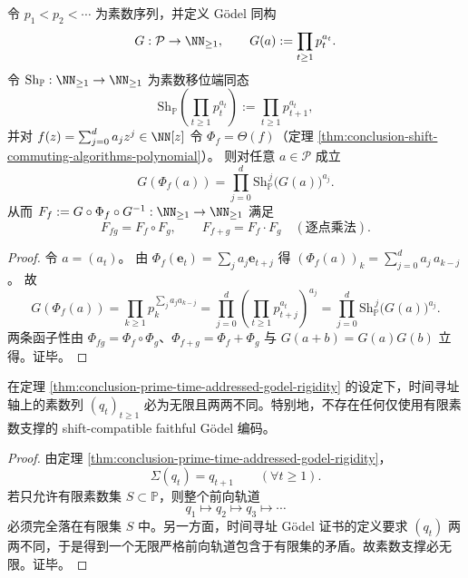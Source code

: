 \begin{proposition}\label{prop:conclusion-godel-integerization-prime-shift-polynomial}
令 \(p_1<p_2<\cdots\) 为素数序列，并定义 Gödel 同构
\[
G:\mathcal P\to\NN_{\ge 1},\qquad
G(a):=\prod_{t\ge 1}p_t^{a_t}.
\]
令 \(\mathrm{Sh}_{\mathbb P}:\NN_{\ge 1}\to\NN_{\ge 1}\) 为素数移位端同态
\[
\mathrm{Sh}_{\mathbb P}\!\left(\prod_{t\ge 1}p_t^{a_t}\right):=\prod_{t\ge 1}p_{t+1}^{a_t},
\]
并对 \(f(z)=\sum_{j=0}^d a_j z^j\in\NN[z]\) 令 \(\Phi_f=\Theta(f)\)（定理 \ref{thm:conclusion-shift-commuting-algorithms-polynomial}）。
则对任意 \(a\in\mathcal P\) 成立
\[
G(\Phi_f(a))=\prod_{j=0}^{d}\mathrm{Sh}_{\mathbb P}^{\,j}\!\bigl(G(a)\bigr)^{a_j}.
\]
从而 \(F_f:=G\circ\Phi_f\circ G^{-1}:\NN_{\ge 1}\to\NN_{\ge 1}\) 满足
\[
F_{fg}=F_f\circ F_g,\qquad
F_{f+g}=F_f\cdot F_g\quad(\text{逐点乘法}).
\]
\end{proposition}
\begin{proof}
令 \(a=(a_t)\)。
由 \(\Phi_f(\mathbf e_t)=\sum_j a_j\mathbf e_{t+j}\) 得
\(
(\Phi_f(a))_k=\sum_{j=0}^{d}a_j\,a_{k-j}
\)。
故
\[
G(\Phi_f(a))
=\prod_{k\ge 1}p_k^{\sum_j a_j a_{k-j}}
=\prod_{j=0}^{d}\left(\prod_{t\ge 1}p_{t+j}^{a_t}\right)^{a_j}
=\prod_{j=0}^{d}\mathrm{Sh}_{\mathbb P}^{\,j}\!\bigl(G(a)\bigr)^{a_j}.
\]
两条函子性由 \(\Phi_{fg}=\Phi_f\circ\Phi_g\)、\(\Phi_{f+g}=\Phi_f+\Phi_g\) 与 \(G(a+b)=G(a)G(b)\) 立得。证毕。
\end{proof}

\begin{corollary}\label{cor:conclusion-faithful-time-addressed-godel-needs-infinite-prime-support}
在定理 \ref{thm:conclusion-prime-time-addressed-godel-rigidity} 的设定下，时间寻址轴上的素数列 \((q_t)_{t\ge 1}\) 必为无限且两两不同。特别地，不存在任何仅使用有限素数支撑的 shift-compatible faithful Gödel 编码。
\end{corollary}

\begin{proof}
由定理 \ref{thm:conclusion-prime-time-addressed-godel-rigidity}，
\[
\Sigma(q_t)=q_{t+1}\qquad(\forall t\ge 1).
\]
若只允许有限素数集 \(S\subset\mathbb P\)，则整个前向轨道
\[
q_1\mapsto q_2\mapsto q_3\mapsto \cdots
\]
必须完全落在有限集 \(S\) 中。另一方面，时间寻址 Gödel 证书的定义要求 \((q_t)\) 两两不同，于是得到一个无限严格前向轨道包含于有限集的矛盾。故素数支撑必无限。证毕。
\end{proof}

